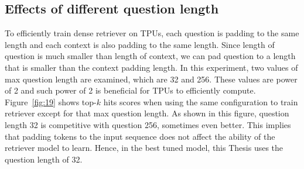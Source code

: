 \documentclass[12pt, sort&compress]{report}
\begin{document}
\subsection{Effects of different question length}
\label{sec:4.4.2}
To efficiently train dense retriever on TPUs, each question is padding to the same length and each context is also padding to the same length. Since length of question is much smaller than length of context, we can pad question to a length that is smaller than the context padding length. In this experiment, two values of max question length are examined, which are 32 and 256. These values are power of 2 and such power of 2 is beneficial for TPUs to efficiently compute. Figure~\ref{fig:19} shows top-$k$ hits scores when using the same configuration to train retriever except for that max question length. As shown in this figure, question length 32 is competitive with question 256, sometimes even better. This implies that padding tokens to the input sequence does not affect the ability of the retriever model to learn. Hence, in the best tuned model, this Thesis uses the question length of 32. 
\end{document}
